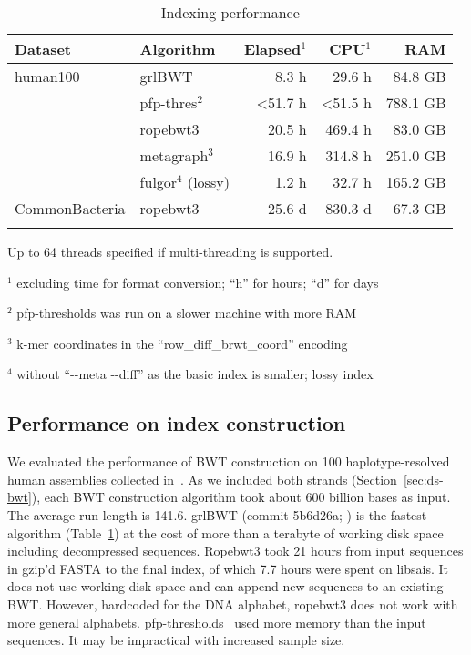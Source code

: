 \documentclass[webpdf,contemporary,large,namedate]{oup-authoring-template}%
\begin{document}
\begin{table}[b]
\caption{Indexing performance\label{tab:index}}
\begin{tabular*}{\columnwidth}{@{\extracolsep\fill}llrrr@{\extracolsep\fill}}
\toprule
Dataset        & Algorithm     & Elapsed$^1$ & CPU$^1$  &     RAM \\
\midrule
human100       & grlBWT        &  8.3 h       &  29.6 h &  84.8 GB \\
		       & pfp-thres$^2$ &<51.7 h       & <51.5 h & 788.1 GB \\
               & ropebwt3      & 20.5 h       & 469.4 h &  83.0 GB \\
			   & metagraph$^3$ & 16.9 h       & 314.8 h & 251.0 GB \\
			   & fulgor$^4$ (lossy)& 1.2 h    &  32.7 h & 165.2 GB \\
CommonBacteria & ropebwt3      & 25.6 d       & 830.3 d &  67.3 GB \\
\botrule
\end{tabular*}
\begin{tablenotes}\setlength\itemsep{0.0em}
\item Up to 64 threads specified if multi-threading is supported.
\item[$^{1}$] excluding time for format conversion; ``h'' for hours; ``d'' for days
\item[$^{2}$] pfp-thresholds was run on a slower machine with more RAM
\item[$^{3}$] k-mer coordinates in the ``row\_diff\_brwt\_coord'' encoding
\item[$^{4}$] without ``-{}-meta -{}-diff'' as the basic index is smaller; lossy index
\end{tablenotes}
\end{table}

\subsection{Performance on index construction}

We evaluated the performance of BWT construction on 100 haplotype-resolved human assemblies collected in~\citet{Li:2024ab}.
As we included both strands (Section~\ref{sec:ds-bwt}), each BWT construction algorithm took about 600 billion bases as input.
The average run length is 141.6.
grlBWT (commit 5b6d26a; \citealt*{DBLP:journals/iandc/DiazDominguezN23}) is the fastest algorithm (Table~\ref{tab:index})
at the cost of more than a terabyte of working disk space including decompressed sequences.
Ropebwt3 took 21 hours from input sequences in gzip'd FASTA to the final index, of which 7.7 hours were spent on libsais.
It does not use working disk space and can append new sequences to an existing BWT.
However, hardcoded for the DNA alphabet, ropebwt3 does not work with more general alphabets.
pfp-thresholds~\citep{Rossi:2022aa} used more memory than the input sequences.
It may be impractical with increased sample size.
\end{document}
